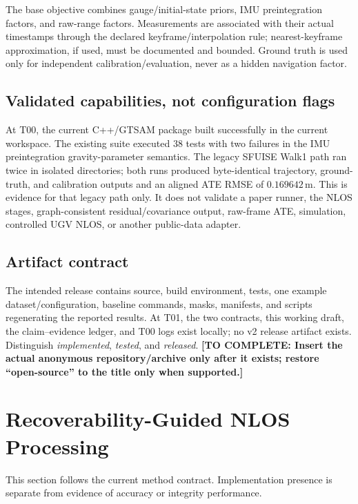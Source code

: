 \documentclass[conference]{IEEEtran}%
\newcommand{\todo}[1]{\textcolor{red!70!black}{\textbf{[TO COMPLETE: #1]}}}
\begin{document}
The base objective combines gauge/initial-state priors, IMU preintegration factors, and raw-range factors. Measurements are associated with their actual timestamps through the declared keyframe/interpolation rule; nearest-keyframe approximation, if used, must be documented and bounded. Ground truth is used only for independent calibration/evaluation, never as a hidden navigation factor.

\subsection{Validated capabilities, not configuration flags}
At T00, the current C++/GTSAM package built successfully in the current workspace. The existing suite executed 38 tests with two failures in the IMU preintegration gravity-parameter semantics. The legacy SFUISE Walk1 path ran twice in isolated directories; both runs produced byte-identical trajectory, ground-truth, and calibration outputs and an aligned ATE RMSE of $0.169642\,\mathrm m$. This is evidence for that legacy path only. It does not validate a paper runner, the NLOS stages, graph-consistent residual/covariance output, raw-frame ATE, simulation, controlled UGV NLOS, or another public-data adapter.

\subsection{Artifact contract}
The intended release contains source, build environment, tests, one example dataset/configuration, baseline commands, masks, manifests, and scripts regenerating the reported results. At T01, the two contracts, this working draft, the claim--evidence ledger, and T00 logs exist locally; no v2 release artifact exists. Distinguish \emph{implemented}, \emph{tested}, and \emph{released}. \todo{Insert the actual anonymous repository/archive only after it exists; restore ``open-source'' to the title only when supported.}

\section{Recoverability-Guided NLOS Processing}
\label{sec:method}
This section follows the current method contract.  Implementation presence is
separate from evidence of accuracy or integrity performance.
\end{document}
